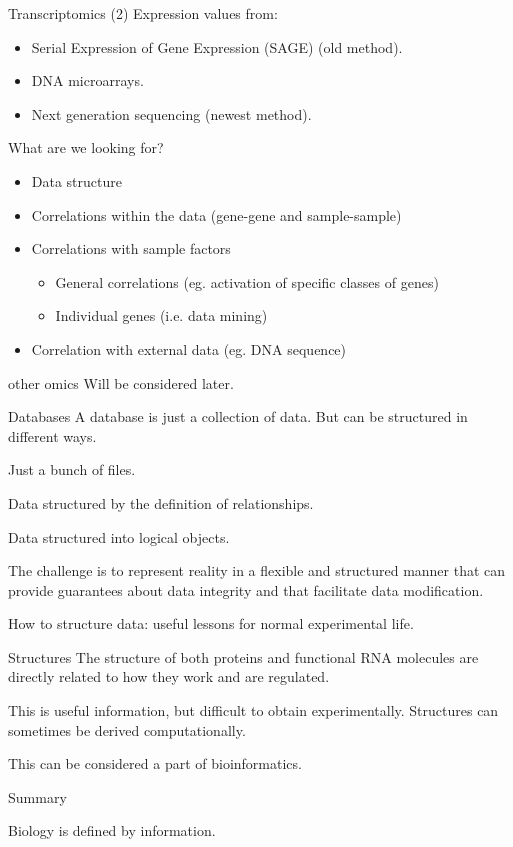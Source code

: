 \documentclass[pdf]{beamer}
\newcommand\subHeading[1]{
  \par\bigskip {\Large\bfseries#1}\par\smallskip
}
\begin{document}
\begin{frame}{Transcriptomics (2)}
  Expression values from:
  \begin{itemize}
    \item Serial Expression of Gene Expression (SAGE) (old method).
    \item DNA microarrays.
    \item Next generation sequencing (newest method).
  \end{itemize}
  What are we looking for?
  \begin{itemize}
    \item Data structure
    \item Correlations within the data (gene-gene and sample-sample)
    \item Correlations with sample factors
      \begin{itemize}
        \item General correlations (eg. activation of specific classes of genes)
        \item Individual genes (i.e. data mining)
      \end{itemize}
    \item Correlation with external data (eg. DNA sequence)
  \end{itemize}
\end{frame}

\begin{frame}{other omics}
  Will be considered later.
\end{frame}

\begin{frame}{Databases}
  A database is just a collection of data.
  \pause
  But can be structured in different ways.
  \begin{description}
    \item[Flat file] Just a bunch of files.
    \item[Relational] Data structured by the definition of relationships.
    \item[Object orientated] Data structured into logical objects.
  \end{description}
  \pause
  The challenge is to represent reality in a flexible and structured manner that can provide
  guarantees about data integrity and that facilitate data modification.
  
  \pause
  How to structure data: useful lessons for normal experimental life.
\end{frame}

\begin{frame}{Structures}
  The structure of both proteins and functional RNA molecules are directly related to how
  they work and are regulated.

  This is useful information, but difficult to obtain experimentally. Structures can sometimes
  be derived computationally.

  This can be considered a part of bioinformatics.
\end{frame}

\begin{frame}{Summary}
  \subHeading{The problem domain is biology}

  Biology is defined by information.
\end{frame}
\end{document}
